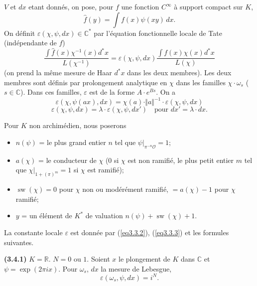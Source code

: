 \documentclass[11pt,a4paper]{amsart}
\theoremstyle{plain}
\theoremstyle{definition}
\newcommand{\dbR}{\mathbb{R}}
\newcommand{\dbC}{\mathbb{C}}
\DeclareMathOperator{\sw}{sw}
\newenvironment{para}{\par\noindent}{\par}
\newcommand{\scrO}{\mathscr{O}}
\newcommand{\eps}{\varepsilon}
\newcommand{\wh}{\widehat}
\newcommand{\vl}{\Vert}
\newcommand{\vr}{\Vert}
\begin{document}
\begin{para}
$V$ et $dx$ etant donn\'es, on pose, pour $f$ une fonction $C^{\infty}$ \`a support compact sur $K$,
\[
\wh{f}(y) = \int f(x) \psi(xy)\, dx.
\]
On d\'efinit $\eps(\chi,\psi,dx) \in \dbC^{*}$ par l'\'equation fonctionnelle locale de Tate (ind\'ependante de $f$)
\begin{equation}\label{eq3.3.1}
\frac{\int \wh{f}(x) \chi^{-1}(x) d^{*}x}{L(\chi^{-1})} = \eps(\chi,\psi,dx) \frac{\int f(x) \chi(x) d^{*}x}{L(\chi)}
\end{equation}
(on prend la m\^eme mesure de Haar $d^{*}x$ dans les deux membres). Les deux membres sont d\'efinis par prolongement analytique en $\chi$ dans les familles $\chi \cdot \omega_{s}$ ($s \in \dbC$). Dans ces familles, $\eps$ est de la forme $A \cdot e^{Bs}$. On a
\begin{equation}\label{eq3.3.2}
\eps(\chi,\psi(ax),dx) = \chi(a) \cdot \vl a \vr^{-1} \cdot \eps(\chi,\psi,dx)
\end{equation}
\begin{equation}\label{eq3.3.3}
\eps(\chi,\psi,dx) = \lambda \cdot \eps(\chi,\psi,dx') \quad \text{pour } dx' = \lambda \cdot dx.
\end{equation}
\end{para}

\begin{para}
Pour $K$ non archim\'edien, nous poserons
\begin{itemize}
\item $n(\psi)$ = le plus grand entier $n$ tel que $\psi|_{\pi^{-n}\scrO} = 1$;
\item $a(\chi)$ = le conducteur de $\chi$ ($0$ si $\chi$ est non ramifi\'e, le plus petit entier $m$ tel que $\chi|_{1+(\pi)^{m}} = 1$ si $\chi$ est ramifi\'e);
\item $\sw(\chi) = 0$ pour $\chi$ non ou mod\'er\'ement ramifi\'e, $= a(\chi)-1$ pour $\chi$ ramifi\'e;
\item $y$ = un \'el\'ement de $K^{*}$ de valuation $n(\psi) + \sw(\chi) + 1$.
\end{itemize}
La constante locale $\eps$ est donn\'ee par (\ref{eq3.3.2}), (\ref{eq3.3.3}) et les formules suivantes.
\end{para}

\begin{para}
\textbf{(3.4.1)} $K = \dbR$. $N = 0$ ou $1$. Soient $x$ le plongement de $K$ dans $\dbC$ et $\psi = \exp(2\pi i x)$. Pour $\omega_{s}$, $dx$ la mesure de Lebesgue,
\[
\eps(\omega_{s},\psi,dx) = i^{N}.
\]
\end{para}
\end{document}
